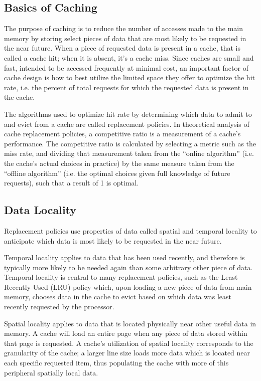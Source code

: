 \documentclass[12pt,twoside]{reedthesis}
\begin{document}
	\subsection*{Basics of Caching}
	
	The purpose of caching is to reduce the number of accesses made to the main memory by storing select pieces of data that are most likely to be requested in the near future. When a piece of requested data is present in a cache, that is called a cache hit; when it is absent, it's a cache miss. Since caches are small and fast, intended to be accessed frequently at minimal cost, an important factor of cache design is how to best utilize the limited space they offer to optimize the hit rate, i.e. the percent of total requests for which the requested data is present in the cache.
	
	The algorithms used to optimize hit rate by determining which data to admit to and evict from a cache are called replacement policies. In theoretical analysis of cache replacement policies, a competitive ratio is a measurement of a cache's performance. The competitive ratio is calculated by selecting a metric such as the miss rate, and dividing that measurement taken from the ``online algorithm'' (i.e. the cache's actual choices in practice) by the same measure taken from the ``offline algorithm'' (i.e. the optimal choices given full knowledge of future requests), such that a result of 1 is optimal.

	\subsection*{Data Locality}

	Replacement policies use properties of data called spatial and temporal locality to anticipate which data is most likely to be requested in the near future.
	
	Temporal locality applies to data that has been used recently, and therefore is typically more likely to be needed again than some arbitrary other piece of data. Temporal locality is central to many replacement policies, such as the Least Recently Used (LRU) policy which, upon loading a new piece of data from main memory, chooses data in the cache to evict based on which data was least recently requested by the processor.
	
	Spatial locality applies to data that is located physically near other useful data in memory. A cache will load an entire page when any piece of data stored within that page is requested. A cache's utilization of spatial locality corresponds to the granularity of the cache; a larger line size loads more data which is located near each specific requested item, thus populating the cache with more of this peripheral spatially local data.
\end{document}
